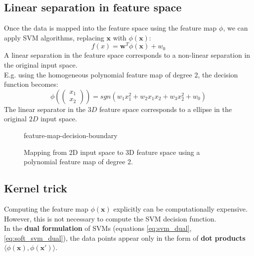 \subsection{Linear separation in feature space}
Once the data is mapped into the feature space using the feature map $\phi$, we can apply SVM algorithms, replacing $\boldsymbol{x}$ with $\phi(\boldsymbol{x})$:
\begin{equation}
    f(x) = \boldsymbol{w}^T \phi(\boldsymbol{x}) + w_0
\end{equation}
A linear separation in the feature space corresponds to a non-linear separation in the original input space.
\\E.g. using the homogeneous polynomial feature map of degree $2$, the decision function becomes:
\[
    \phi\!\left(\begin{pmatrix} x_1 \\ x_2 \end{pmatrix}\right) = sgn(w_1 x_1^2 + w_2 x_1 x_2 + w_3 x_2^2 + w_0)
\]
The linear separator in the $3D$ feature space corresponds to a ellipse in the original $2D$ input space.
\begin{figure}[H]
    \centering
    {feature-map-decision-boundary}
    \caption{Mapping from 2D input space to 3D feature space using a polynomial feature map of degree 2.}
    \label{fig:feature_map}
\end{figure}

\subsection{Kernel trick}
Computing the feature map $\phi(\boldsymbol{x})$ explicitly can be computationally expensive. 
However, this is not necessary to compute the SVM decision function.
\\In the \textbf{dual formulation} of SVMs (equations \ref{eq:svm_dual}, \ref{eq:soft_svm_dual}), the data points appear only in the form of \textbf{dot products} 
$\langle \phi(\boldsymbol{x}), \phi(\boldsymbol{x}') \rangle$.
